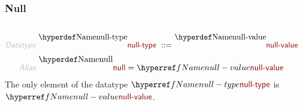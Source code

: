 \subsubsection*{Null}\hypertarget{null}{}\label{null}

\begin{align*}
  [ ~ 
  \KEY{Datatype} ~ & \NAMEREF{null-type} \\
  \KEY{Funcon} ~ & \NAMEREF{null-value} \\
  \KEY{Alias} ~ & \NAMEREF{null}
  ~ ]
\end{align*}
\begin{align*}
  \KEY{Datatype} ~ 
  \NAMEDECL{null-type}  
  ~ ::= ~ & \NAMEDECL{null-value} 
\end{align*}
\begin{align*}
  \KEY{Alias} ~ 
  & \NAMEDECL{null} = \NAMEREF{null-value}
\end{align*}
The only element of the datatype $\SHADE{\NAMEREF{null-type}}$ is $\SHADE{\NAMEREF{null-value}}$.

